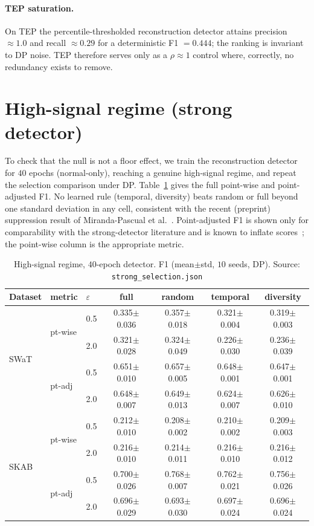 \documentclass{article}
\providecommand{\botrule}{\bottomrule}%
\begin{document}
\paragraph{TEP saturation.} On TEP the percentile-thresholded reconstruction detector
attains precision $\approx1.0$ and recall $\approx0.29$ for a deterministic F1 $=0.444$;
the ranking is invariant to DP noise. TEP therefore serves only as a $\rho\!\approx\!1$
control where, correctly, no redundancy exists to remove.

\section{High-signal regime (strong detector)}\label{supp:strong}
To check that the null is not a floor effect, we train the reconstruction detector
for $40$ epochs (normal-only), reaching a genuine high-signal regime, and repeat the
selection comparison under DP. Table~\ref{tab:sstrong} gives the full point-wise and
point-adjusted F1. No learned rule (temporal, diversity) beats random or full beyond
one standard deviation in any cell, consistent with the recent (preprint) suppression
result of Miranda-Pascual et al.~\cite{stoddard2026suppress}. Point-adjusted F1 is shown only
for comparability with the strong-detector literature and is known to inflate
scores~\cite{kim2022rigorous}; the point-wise column is the appropriate metric.

\begin{table}[h]\centering
\caption{High-signal regime, $40$-epoch detector. F1 (mean$\pm$std, $10$ seeds, DP).
Source: \texttt{strong\_selection.json}}\label{tab:sstrong}
\begin{tabular}{@{}lllcccc@{}}
\toprule
Dataset & metric & $\varepsilon$ & full & random & temporal & diversity \\
\midrule
\multirow{4}{*}{SWaT} & \multirow{2}{*}{pt-wise} & 0.5 & 0.335$\pm$0.036 & 0.357$\pm$0.018 & 0.321$\pm$0.004 & 0.319$\pm$0.003 \\
 & & 2.0 & 0.321$\pm$0.028 & 0.324$\pm$0.049 & 0.226$\pm$0.030 & 0.236$\pm$0.039 \\
 & \multirow{2}{*}{pt-adj} & 0.5 & 0.651$\pm$0.010 & 0.657$\pm$0.005 & 0.648$\pm$0.001 & 0.647$\pm$0.001 \\
 & & 2.0 & 0.648$\pm$0.007 & 0.649$\pm$0.013 & 0.624$\pm$0.007 & 0.626$\pm$0.010 \\
\midrule
\multirow{4}{*}{SKAB} & \multirow{2}{*}{pt-wise} & 0.5 & 0.212$\pm$0.010 & 0.208$\pm$0.002 & 0.210$\pm$0.002 & 0.209$\pm$0.003 \\
 & & 2.0 & 0.216$\pm$0.010 & 0.214$\pm$0.011 & 0.216$\pm$0.010 & 0.216$\pm$0.012 \\
 & \multirow{2}{*}{pt-adj} & 0.5 & 0.700$\pm$0.026 & 0.768$\pm$0.007 & 0.762$\pm$0.021 & 0.756$\pm$0.026 \\
 & & 2.0 & 0.696$\pm$0.029 & 0.693$\pm$0.030 & 0.697$\pm$0.024 & 0.696$\pm$0.024 \\
\botrule
\end{tabular}
\end{table}
\end{document}
